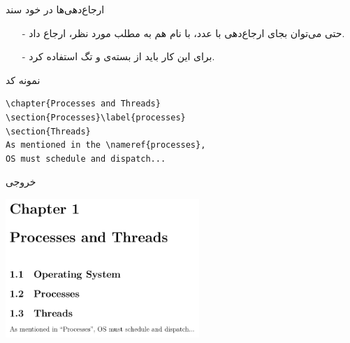 \begin{frame}{ارجاع‌دهی‌‌ها در خود سند}
\begin{itemize}\itemr
\item[-]
حتی می‌توان بجای ارجاع‌دهی با عدد، با نام هم به مطلب مورد نظر، ارجاع داد.

\item[-]
برای این کار باید از بسته‌ی 
و تگ
استفاده کرد.
\end{itemize}
\end{frame}

\begin{frame}[fragile]{نمونه کد}
\begin{latin}
\begin{lstlisting}[keywords={chapter, section, label, ref}, keywordstyle=\color{Mulberry}\textbf]
\chapter{Processes and Threads}
\section{Processes}\label{processes}
\section{Threads}
As mentioned in the \nameref{processes},
OS must schedule and dispatch...
\end{lstlisting}
\end{latin}
\end{frame}

\begin{frame}{خروجی}
\begin{center}
\includegraphics[width=0.55\textwidth, height=0.7\textheight]{docs/images/proc-nameref}
\end{center}
\end{frame}

